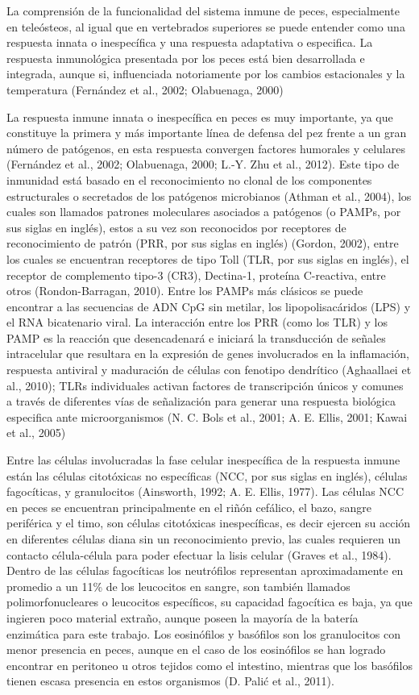 \documentclass[12pt,a4paper,]{article}
\begin{document}
La comprensión de la funcionalidad del sistema inmune de peces,
especialmente en teleósteos, al igual que en vertebrados superiores se
puede entender como una respuesta innata o inespecífica y una respuesta
adaptativa o especifica. La respuesta inmunológica presentada por los
peces está bien desarrollada e integrada, aunque si, influenciada
notoriamente por los cambios estacionales y la temperatura (Fernández et
al., 2002; Olabuenaga, 2000)

La respuesta inmune innata o inespecífica en peces es muy importante, ya
que constituye la primera y más importante línea de defensa del pez
frente a un gran número de patógenos, en esta respuesta convergen
factores humorales y celulares (Fernández et al., 2002; Olabuenaga,
2000; L.-Y. Zhu et al., 2012). Este tipo de inmunidad está basado en el
reconocimiento no clonal de los componentes estructurales o secretados
de los patógenos microbianos (Athman et al., 2004)⁠, los cuales son
llamados patrones moleculares asociados a patógenos (o PAMPs, por sus
siglas en inglés), estos a su vez son reconocidos por receptores de
reconocimiento de patrón (PRR, por sus siglas en inglés) (Gordon, 2002),
entre los cuales se encuentran receptores de tipo Toll (TLR, por sus
siglas en inglés), el receptor de complemento tipo-3 (CR3), Dectina-1,
proteína C-reactiva, entre otros (Rondon-Barragan, 2010). Entre los
PAMPs más clásicos se puede encontrar a las secuencias de ADN CpG sin
metilar, los lipopolisacáridos (LPS) y el RNA bicatenario viral. La
interacción entre los PRR (como los TLR) y los PAMP es la reacción que
desencadenará e iniciará la transducción de señales intracelular que
resultara en la expresión de genes involucrados en la inflamación,
respuesta antiviral y maduración de células con fenotipo dendrítico
(Aghaallaei et al., 2010)⁠; TLRs individuales activan factores de
transcripción únicos y comunes a través de diferentes vías de
señalización para generar una respuesta biológica especifica ante
microorganismos (N. C. Bols et al., 2001; A. E. Ellis, 2001; Kawai et
al., 2005)

Entre las células involucradas la fase celular inespecífica de la
respuesta inmune están las células citotóxicas no específicas (NCC, por
sus siglas en inglés), células fagocíticas, y granulocitos (Ainsworth,
1992; A. E. Ellis, 1977). Las células NCC en peces se encuentran
principalmente en el riñón cefálico, el bazo, sangre periférica y el
timo, son células citotóxicas inespecíficas, es decir ejercen su acción
en diferentes células diana sin un reconocimiento previo, las cuales
requieren un contacto célula-célula para poder efectuar la lisis celular
(Graves et al., 1984). Dentro de las células fagocíticas los neutrófilos
representan aproximadamente en promedio a un 11\% de los leucocitos en
sangre, son también llamados polimorfonucleares o leucocitos
específicos, su capacidad fagocítica es baja, ya que ingieren poco
material extraño, aunque poseen la mayoría de la batería enzimática para
este trabajo. Los eosinófilos y basófilos son los granulocitos con menor
presencia en peces, aunque en el caso de los eosinófilos se han logrado
encontrar en peritoneo u otros tejidos como el intestino, mientras que
los basófilos tienen escasa presencia en estos organismos (D. Palić et
al., 2011).
\end{document}
